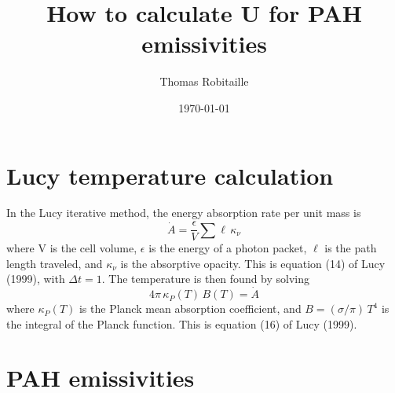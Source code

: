 \documentclass[11pt]{article}
\begin{document}
\title{How to calculate U for PAH emissivities}
\author{Thomas Robitaille}
\date{\today}
\maketitle

\section{Lucy temperature calculation}

\noindent In the Lucy iterative method, the energy absorption rate per unit mass is
\begin{equation}
\dot{A} = \frac{\epsilon}{V}\sum \ell\,\kappa_\nu
\end{equation}
where V is the cell volume,  $\epsilon$ is the energy of a photon packet, $\ell$ is the path length traveled, and $\kappa_\nu$ is the absorptive opacity. This is equation (14) of Lucy (1999), with $\Delta t=1$. The temperature is then found by solving
\begin{equation}
4\pi\,\kappa_P(T)\,B(T) = \dot{A}
\end{equation}
where $\kappa_P(T)$ is the Planck mean absorption coefficient, and $B=(\sigma/\pi)\,T^4$ is the integral of the Planck function. This is equation (16) of Lucy (1999).

\section{PAH emissivities}
\end{document}
